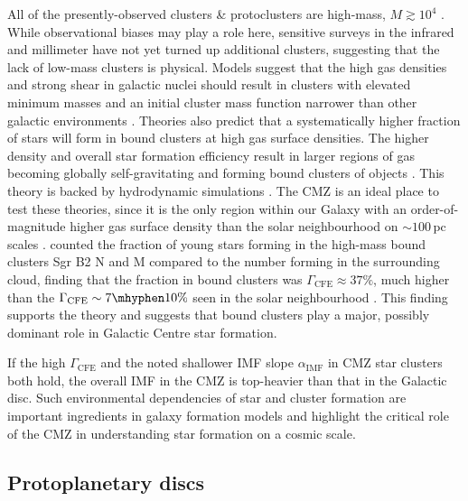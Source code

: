 All of the presently-observed clusters \& protoclusters are high-mass, $M\gtrsim10^4$ \msun.
While observational biases may play a role here, sensitive surveys in the infrared and millimeter have not yet turned up additional clusters, suggesting that the lack of low-mass clusters is physical.
Models suggest that the high gas densities and strong shear in galactic nuclei should result in clusters with elevated minimum masses and an initial cluster mass function narrower than other galactic environments \citep{Trujillo-Gomez2019}.
Theories also predict that a systematically higher fraction of stars will form in bound clusters at high gas surface densities.
The higher density and overall star formation efficiency result in larger regions of gas becoming globally self-gravitating and forming bound clusters of objects \citep{Kruijssen2012}.
This theory is backed by hydrodynamic simulations \citep[e.g.][]{Grudic2021}.
The CMZ is an ideal place to test these theories, since it is the only region within our Galaxy with an order-of-magnitude higher gas surface density than the solar neighbourhood on $\sim100$\,pc scales .
\citet{Ginsburg2018a} counted the fraction of young stars forming in the high-mass bound clusters Sgr B2 N and M compared to the number forming in the surrounding cloud, finding that the fraction in bound clusters was $\Gamma_\mathrm{CFE}\approx37\%$, much higher than the $\Gamma_\mathrm{CFE}\sim7\mhyphen10\%$ seen in the solar neighbourhood \citep[e.g.][]{Lada2003}.
This finding supports the theory and suggests that bound clusters play a major, possibly dominant role in Galactic Centre star formation.

If the high $\Gamma_\mathrm{CFE}$ and the noted shallower IMF slope $\alpha_\mathrm{IMF}$ in CMZ star clusters both hold, the overall IMF in the CMZ is top-heavier than that in the Galactic disc.
Such environmental dependencies of star and cluster formation are important ingredients in galaxy formation models and highlight the critical role of the CMZ in understanding star formation on a cosmic scale.

\subsection{Protoplanetary discs} 
\label{sec:ppds}

